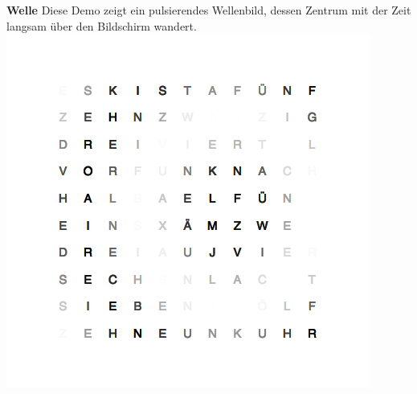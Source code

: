 \begin{multicols}{2}
\textbf{Welle}
Diese Demo zeigt ein pulsierendes Wellenbild, dessen Zentrum mit der Zeit langsam über den Bildschirm wandert.
\includegraphics[width=\columnwidth]{Abbildungen/Software/Demo/Welle}


\end{multicols}
